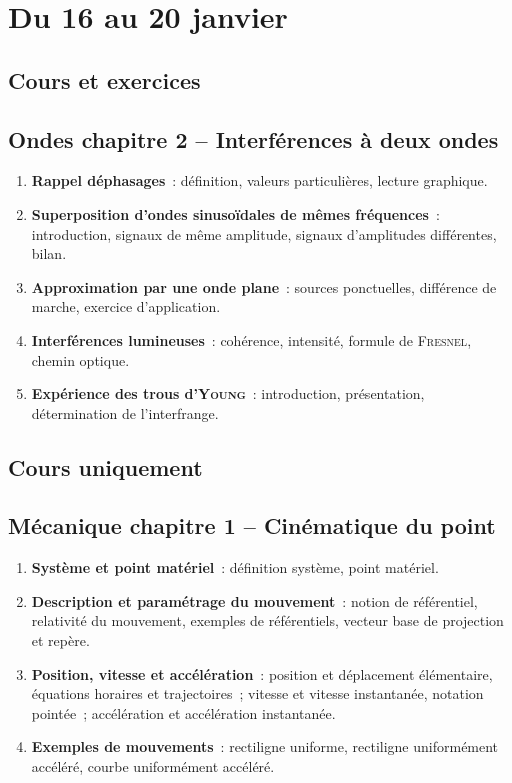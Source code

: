 \documentclass[a4paper, 10pt, final, garamond]{book}
\begin{document}
\setcounter{chapter}{14}

\chapter{Du 16 au 20 janvier}

\section{Cours et exercices}
\section*{Ondes chapitre 2 -- Interférences à deux ondes}
\begin{enumerate}[label=\Roman*]
    \item \textbf{Rappel déphasages}~: définition, valeurs particulières,
        lecture graphique.
    \item \textbf{Superposition d'ondes sinusoïdales de mêmes fréquences}~:
        introduction, signaux de même amplitude, signaux d'amplitudes
        différentes, bilan.
    \item \textbf{Approximation par une onde plane}~: sources ponctuelles,
        différence de marche, exercice d'application.
    \item \textbf{Interférences lumineuses}~: cohérence, intensité, formule de
        \textsc{Fresnel}, chemin optique.
    \item \textbf{Expérience des trous d'\textsc{Young}}~: introduction,
        présentation, détermination de l'interfrange.
\end{enumerate}

\section{Cours uniquement}
\section*{Mécanique chapitre 1 -- Cinématique du point}
\begin{enumerate}[label=\Roman*]
    \item \textbf{Système et point matériel}~: définition système, point
        matériel.
    \item \textbf{Description et paramétrage du mouvement}~: notion de
        référentiel, relativité du mouvement, exemples de référentiels, vecteur
        base de projection et repère.
    \item \textbf{Position, vitesse et accélération}~: position et déplacement
        élémentaire, équations horaires et trajectoires~; vitesse et vitesse
        instantanée, notation pointée~; accélération et accélération
        instantanée.
    \item \textbf{Exemples de mouvements}~: rectiligne uniforme, rectiligne
        uniformément accéléré, courbe uniformément accéléré.
\end{enumerate}
\end{document}

